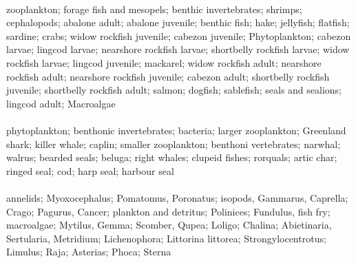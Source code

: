 \fullhline
\hline
{} \\
\hline
zooplankton; forage fish and mesopels; benthic invertebrates; shrimps; cephalopods; abalone adult; abalone juvenile; benthic fish; hake; jellyfish; flatfish; sardine; crabs; widow rockfish juvenile; cabezon juvenile; Phytoplankton; cabezon larvae; lingcod larvae; nearshore rockfish larvae; shortbelly rockfish larvae; widow rockfish larvae; lingcod juvenile; mackarel; widow rockfish adult; nearshore rockfish adult; nearshore rockfish juvenile; cabezon adult; shortbelly rockfish juvenile; shortbelly rockfish adult; salmon; dogfish; sablefish; seals and sealions; lingcod adult; Macroalgae\\
\fullhline
\hline
{} \\
\hline
phytoplankton; benthonic invertebrates; bacteria; larger zooplankton; Greenland shark; killer whale; caplin; smaller zooplankton; benthoni vertebrates; narwhal; walrus; bearded seals; beluga; right whales; clupeid fishes; rorquals; artic char; ringed seal; cod; harp seal; harbour seal\\
\fullhline
\hline
{} \\
\hline
annelids; Myoxocephalus; Pomatomus, Poronatus; isopods, Gammarus, Caprella; Crago; Pagurus, Cancer; plankton and detritus; Polinices; Fundulus, fish fry; macroalgae; Mytilus, Gemma; Scomber, Qupea; Loligo; Chalina; Abietinaria, Sertularia, Metridium; Lichenophora; Littorina littorea; Strongylocentrotus; Limulus; Raja; Asterias; Phoca; Sterna\\
\fullhline
\hline
{} \\
\hline
